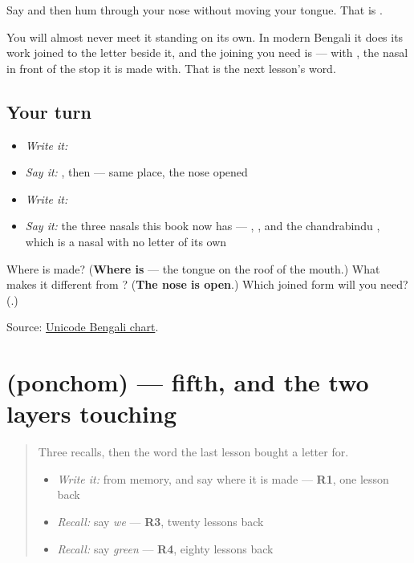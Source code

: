 Say \textbf{} and then hum through your nose without moving your tongue. That is \textbf{}.

You will almost never meet it standing on its own. In modern Bengali it does its work joined to the letter beside it, and the joining you need is \textbf{} — \textbf{} with \textbf{}, the nasal in front of the stop it is made with. That is the next lesson's word.

\subsection*{Your turn}
\begin{itemize}
\raggedright
  \item \emph{Write it:} 
  \item \emph{Say it:} \textbf{}, then \textbf{} — same place, the nose opened
  \item \emph{Write it:} 
  \item \emph{Say it:} the three nasals this book now has — \textbf{}, \textbf{}, and the chandrabindu \textbf{}, which is a nasal with no letter of its own
\end{itemize}

\begin{tcolorbox}[breakable,colback=teal!4,colframe=teal!35!black,title={Before you move on}]
Where is \textbf{} made? (\textbf{Where  is} — the tongue on the roof of the mouth.) What makes it different from \textbf{}? (\textbf{The nose is open}.) Which joined form will you need? (\textbf{}.)

Source: \href{https://www.unicode.org/charts/PDF/U0980.pdf}{Unicode Bengali chart}.
\end{tcolorbox}
\section[\texorpdfstring{\bn{পঞ্চম} (ponchom)}{পঞ্চম (ponchom)}]{ (ponchom) — fifth, and the two layers touching}

\label{lesson:BN-C27-ponchom}



\begin{quote}
Three recalls, then the word the last lesson bought a letter for.

\begin{itemize}
\raggedright
  \item \emph{Write it:} \textbf{} from memory, and say where it is made — \textbf{R1}, one lesson back
  \item \emph{Recall:} say \emph{we} — \textbf{R3}, twenty lessons back
  \item \emph{Recall:} say \emph{green} — \textbf{R4}, eighty lessons back
\end{itemize}
\end{quote}

